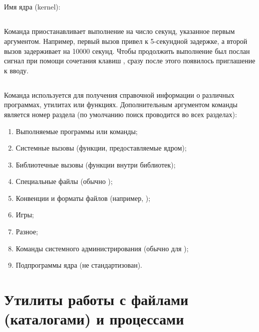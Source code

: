 \subsection{}

Имя ядра (kernel):


\subsection{}

Команда  приостанавливает выполнение на число секунд, указанное первым аргументом. Например, первый вызов привел к 5-секундной задержке, а второй вызов задерживает на 10000 секунд. Чтобы продолжить выполнение был послан сигнал  при помощи сочетания клавиш , сразу после этого появилось приглашение к вводу.


\subsection{}

Команда  используется для получения справочной информации  о различных программах, утилитах или функциях. Дополнительным аргументом команды является номер раздела (по умолчанию поиск проводится во всех разделах):
\begin{enumerate}
	\item Выполняемые программы или  команды;
	\item Системные вызовы (функции, предоставляемые ядром);
	\item Библиотечные вызовы (функции внутри библиотек);
	\item Специальные файлы (обычно );
	\item Конвенции и форматы файлов (например, );
	\item Игры;
	\item Разное;
	\item Команды системного администрирования (обычно для );
	\item Подпрограммы ядра (не стандартизован).
\end{enumerate}


\section{Утилиты работы с файлами (каталогами) и процессами}


